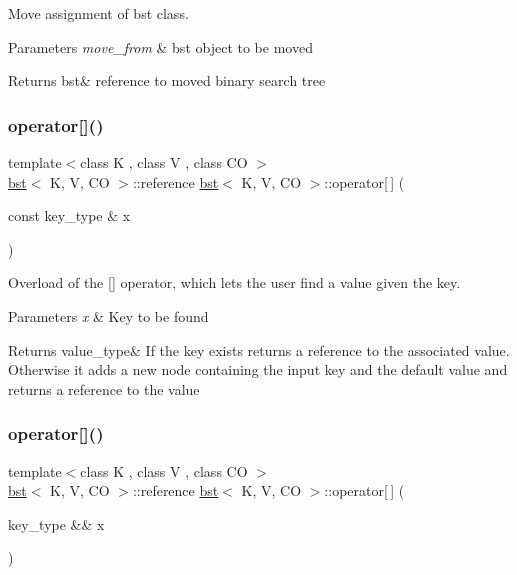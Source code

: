 Move assignment of bst class. 


\begin{DoxyParams}{Parameters}
{\em move\+\_\+from} & bst object to be moved \\
\hline
\end{DoxyParams}
\begin{DoxyReturn}{Returns}
bst\& reference to moved binary search tree 
\end{DoxyReturn}
\mbox{\label{classbst_ad709ae2eca191484456d42774f1b3466}} 
\subsubsection{\texorpdfstring{operator[]()}{operator[]()}\hspace{0.1cm}{\footnotesize\ttfamily [1/2]}}
{\footnotesize\ttfamily template$<$class K , class V , class CO $>$ \\
\hyperlink{classbst}{bst}$<$ K, V, CO $>$\+::reference \hyperlink{classbst}{bst}$<$ K, V, CO $>$\+::operator\mbox{[}$\,$\mbox{]} (\begin{DoxyParamCaption}\item[{const key\+\_\+type \&}]{x }\end{DoxyParamCaption})}



Overload of the \mbox{[}\mbox{]} operator, which lets the user find a value given the key. 


\begin{DoxyParams}{Parameters}
{\em x} & Key to be found \\
\hline
\end{DoxyParams}
\begin{DoxyReturn}{Returns}
value\+\_\+type\& If the key exists returns a reference to the associated value. Otherwise it adds a new node containing the input key and the default value and returns a reference to the value 
\end{DoxyReturn}
\mbox{\label{classbst_a74bb6424a0e67fab1df7b3a8f99ab108}} 
\subsubsection{\texorpdfstring{operator[]()}{operator[]()}\hspace{0.1cm}{\footnotesize\ttfamily [2/2]}}
{\footnotesize\ttfamily template$<$class K , class V , class CO $>$ \\
\hyperlink{classbst}{bst}$<$ K, V, CO $>$\+::reference \hyperlink{classbst}{bst}$<$ K, V, CO $>$\+::operator\mbox{[}$\,$\mbox{]} (\begin{DoxyParamCaption}\item[{key\+\_\+type \&\&}]{x }\end{DoxyParamCaption})}



